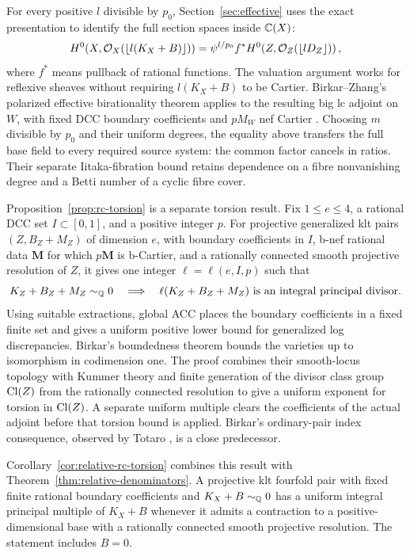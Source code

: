 For every positive $l$ divisible by $p_0$, Section~\ref{sec:effective}
uses the exact presentation to identify the full section spaces inside
$\mathbb C(X)$:
\[
 H^0\!\left(X,\mathcal O_X(\lfloor l(K_X+B)\rfloor)\right)
 =\psi^{l/p_0}f^*H^0\!\left(Z,\mathcal O_Z(\lfloor lD_Z\rfloor)\right),
\]
where $f^*$ means pullback of rational functions.  The valuation argument
works for reflexive sheaves without requiring $l(K_X+B)$ to be Cartier.
Birkar--Zhang's polarized effective birationality theorem applies to the
resulting big lc adjoint on $W$, with fixed DCC boundary coefficients and
$pM_W$ nef Cartier \cite[Theorem~1.3]{BirkarZhang2016}.  Choosing $m$
divisible by $p_0$ and their uniform degrees, the equality above transfers
the full base field to every required source system: the common factor
cancels in ratios.  Their separate Iitaka-fibration bound
\cite[Theorem~1.2]{BirkarZhang2016} retains dependence on a fibre
nonvanishing degree and a Betti number of a cyclic fibre cover.

Proposition~\ref{prop:rc-torsion} is a separate torsion result.  Fix
$1\leq e\leq4$, a rational DCC set $I\subset[0,1]$, and a positive
integer $p$.  For projective generalized klt pairs $(Z,B_Z+M_Z)$ of
dimension $e$, with boundary coefficients in $I$, b-nef rational data
$\mathbf M$ for which $p\mathbf M$ is b-Cartier, and a rationally
connected smooth projective resolution of $Z$, it gives one integer
$\ell=\ell(e,I,p)$ such that
\[
 K_Z+B_Z+M_Z\sim_\mathbb Q0
 \quad\Longrightarrow\quad
 \ell(K_Z+B_Z+M_Z)\text{ is an integral principal divisor}.
\]
Using suitable extractions, global ACC places the boundary coefficients
in a fixed finite set and gives a uniform positive lower bound for
generalized log discrepancies.  Birkar's boundedness theorem
\cite[Theorem~1.7]{BirkarBoundedCY} bounds the varieties up to isomorphism
in codimension one.  The proof combines their smooth-locus topology with
Kummer theory and finite generation of the divisor class group $\operatorname{Cl}(Z)$
from the rationally connected resolution to give a uniform exponent for
torsion in $\operatorname{Cl}(Z)$.
A separate uniform multiple clears the
coefficients of the actual adjoint before that torsion bound is applied.
Birkar's ordinary-pair index consequence, observed by Totaro
\cite[Corollary~1.8 and Section~9.5]{BirkarBoundedCY}, is a close predecessor.

Corollary~\ref{cor:relative-rc-torsion} combines this result with
Theorem~\ref{thm:relative-denominators}.  A projective klt fourfold pair with fixed finite
rational boundary coefficients and $K_X+B\sim_\mathbb Q0$ has a uniform integral
principal multiple of $K_X+B$ whenever it admits a contraction to a
positive-dimensional base with a rationally connected smooth projective
resolution.  The statement includes $B=0$.
